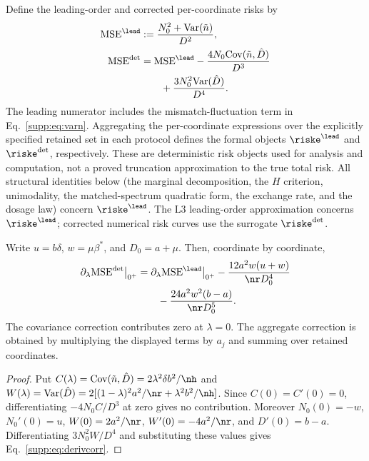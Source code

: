 Define the leading-order and corrected per-coordinate risks by
\begin{align}
  \mathrm{MSE}^{\lead} &:= \frac{N_0^2+\mathrm{Var}(\tilde n)}{D^2}, \notag\\
  \mathrm{MSE}^{\det} &= \mathrm{MSE}^{\lead}
  -\frac{4N_0\mathrm{Cov}(\tilde n,\hat D)}{D^3} \notag\\
  &\qquad +\frac{3N_0^2\mathrm{Var}(\hat D)}{D^4}.
  \label{supp:eq:lead-det}
\end{align}
The leading numerator includes the mismatch-fluctuation term in Eq.~\eqref{supp:eq:varn}.
Aggregating the per-coordinate expressions over the explicitly specified retained set in each protocol defines the formal objects $\riske^{\lead}$ and $\riske^{\det}$, respectively. These are deterministic risk objects used for analysis and computation, not a proved truncation approximation to the true total risk.
All structural identities below (the marginal decomposition, the $H$ criterion, unimodality, the matched-spectrum quadratic form, the exchange rate, and the dosage law) concern $\riske^{\lead}$.
The L3 leading-order approximation concerns $\riske^{\lead}$; corrected numerical risk curves use the surrogate $\riske^{\det}$.

\begin{proposition}
\label{supp:prop:derivcorr}
Write $u=b\delta$, $w=\mu\beta^*$, and $D_0=a+\mu$. Then, coordinate by coordinate,
\begin{align}
  \partial_\lambda\mathrm{MSE}^{\det}\big|_{0^+}
  &=\partial_\lambda\mathrm{MSE}^{\lead}\big|_{0^+}
  -\frac{12a^2w(u+w)}{\nr D_0^4} \notag\\
  &\qquad -\frac{24a^2w^2(b-a)}{\nr D_0^5}.
  \label{supp:eq:derivcorr}
\end{align}
The covariance correction contributes zero at $\lambda=0$.
The aggregate correction is obtained by multiplying the displayed terms by $a_j$ and summing over retained coordinates.
\end{proposition}

\begin{proof}
Put $C(\lambda)=\mathrm{Cov}(\tilde n,\hat D)=2\lambda^2\delta b^2/\nh$ and $W(\lambda)=\mathrm{Var}(\hat D)=2[(1-\lambda)^2a^2/\nr+\lambda^2b^2/\nh]$.
Since $C(0)=C'(0)=0$, differentiating $-4N_0C/D^3$ at zero gives no contribution.
Moreover $N_0(0)=-w$, $N_0'(0)=u$, $W(0)=2a^2/\nr$, $W'(0)=-4a^2/\nr$, and $D'(0)=b-a$.
Differentiating $3N_0^2W/D^4$ and substituting these values gives Eq.~\eqref{supp:eq:derivcorr}.
\end{proof}

